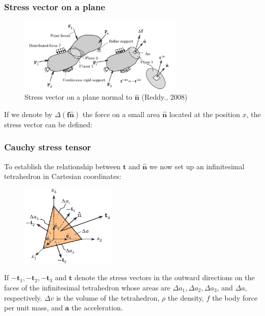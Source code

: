 \documentclass[notes]{beamer}
\begin{document}
\begin{frame}
\frametitle{Stress vector on a plane}
\begin{figure}[ht]
	\centering
	\includegraphics[width=0.7\textwidth]{figs/stress-vector-plane.png}
	\caption*{Stress vector on a plane normal to $\mathbf{\hat{n}}$ (Reddy., 2008)}
\end{figure}

If we denote by $\Delta (\mathbf{f\hat{n}})$ the force on a small area $\mathbf{\hat{n}}$ located at the position $x$, the stress vector can be defined:
\end{frame}

\begin{frame}
\frametitle{Cauchy stress tensor}
To establish the relationship between $\mathbf{t}$ and $\mathbf{\hat{n}}$ we now set up an infinitesimal
tetrahedron in Cartesian coordinates:
\begin{figure}[ht]
	\centering
	\includegraphics[width=0.4\textwidth]{figs/stress-tetrahedron.png}
\end{figure}
If $\mathbf{-t}_1, \mathbf{-t}_2, \mathbf{-t}_3$ and $\mathbf{t}$ denote the stress vectors in the outward directions on the faces of the infinitesimal tetrahedron whose areas are $\Delta a_1, \Delta a_2, \Delta a_3$, and $\Delta a$, respectively. $\Delta v$ is the volume of the tetrahedron, $\rho$ the density, $f$ the body force per unit mass, and $\mathbf{a}$ the acceleration. 
\end{frame}
\end{document}
